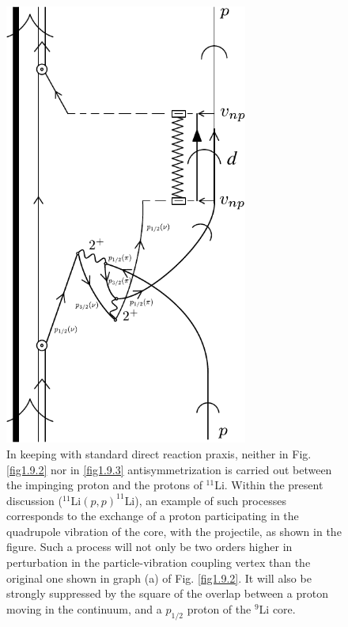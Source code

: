                \begin{figure}[h!]
               \centerline {
               \includegraphics*[width=8cm]{introduccion/figs/fig1_9_4}
               }
               \caption{ In keeping with standard direct reaction praxis, neither in Fig. \ref{fig1.9.2} nor in
               \ref{fig1.9.3} antisymmetrization is carried out between the impinging proton and the protons
               of $^{11}$Li. Within the present discussion
               ($^{11}$Li$(p,p)^{11}$Li), an example of such processes corresponds to the exchange
               of a proton participating in the quadrupole vibration of the core, with the projectile, as
               shown in the figure. Such a process will not only be two orders higher in perturbation
               in the particle-vibration coupling vertex than the original one shown in graph (a) of Fig. \ref{fig1.9.2}. It will also be strongly suppressed by the square of
               the overlap between a proton moving in the continuum, and a $p_{1/2}$ proton of the $^{9}$Li
               core.}
               \label{fig1.9.4}
               \end{figure}
          
